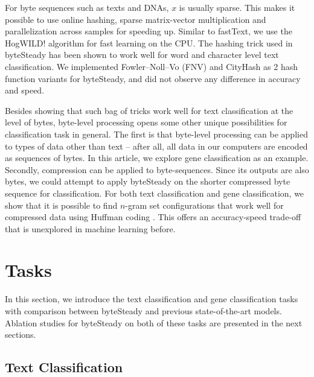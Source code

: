\documentclass[sigconf,review, anonymous]{acmart}
\begin{document}
For byte sequences such as texts and DNAs, \(x\) is usually sparse. This makes it possible to use online hashing, sparse matrix-vector multiplication and parallelization across samples for speeding up. Similar to fastText, we use the HogWILD! \cite{RRWF11} algorithm for fast learning on the CPU. The hashing trick \cite{WDLSA09} used in byteSteady has been shown to work well for word and character level text classification. We implemented Fowler–Noll–Vo (FNV) and CityHash as 2 hash function variants for byteSteady, and did not observe any difference in accuracy and speed.

Besides showing that such bag of tricks work well for text classification at the level of bytes, byte-level processing opens some other unique possibilities for classification task in general. The first is that byte-level processing can be applied to types of data other than text -- after all, all data in our computers are encoded as sequences of bytes. In this article, we explore gene classification as an example. Secondly, compression can be applied to byte-sequences. Since its outputs are also bytes, we could attempt to apply byteSteady on the shorter compressed byte sequence for classification. For both text classification and gene classification, we show that it is possible to find \(n\)-gram set configurations that work well for compressed data using Huffman coding \cite{H52}. This offers an accuracy-speed trade-off that is unexplored in machine learning before.

\section{Tasks}

In this section, we introduce the text classification and gene classification tasks with comparison between byteSteady and previous state-of-the-art models. Ablation studies for byteSteady on both of these tasks are presented in the next sections.

\subsection{Text Classification}
\end{document}
